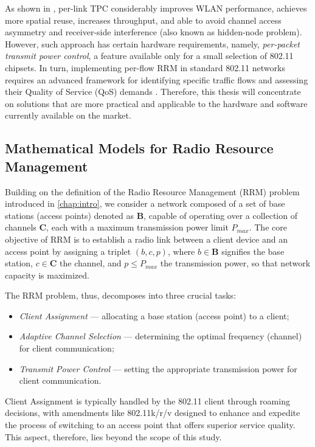 As shown in \cite{ramachandranSymphonySynchronousTwophase2008}, per-link TPC considerably improves WLAN performance, achieves more spatial reuse, increases throughput, and able to avoid channel access asymmetry and receiver-side interference (also known as hidden-node problem). However, such approach has certain hardware requirements, namely, \textit{per-packet transmit power control}, a feature available only for a small selection of 802.11 chipsets.
In turn, implementing per-flow RRM in standard 802.11 networks requires an advanced framework for identifying specific traffic flows and assessing their Quality of Service (QoS) demands \cite{bouhafsPerFlowRadioResource2020}. Therefore, this thesis will concentrate on solutions that are more practical and applicable to the hardware and software currently available on the market.

\subsection{Mathematical Models for Radio Resource Management}
\label{chap:lr:sec:math_models}

Building on the definition of the Radio Resource Management (RRM) problem introduced in \ref{chap:intro}, we consider a network composed of a set of base stations (access points) denoted as $\boldsymbol{B}$, capable of operating over a collection of channels $\boldsymbol{C}$, each with a maximum transmission power limit $P_{max}$. The core objective of RRM is to establish a radio link between a client device and an access point by assigning a triplet $(b, c, p)$, where $b \in \boldsymbol{B}$ signifies the base station, $c \in \boldsymbol{C}$ the channel, and $p \leq P_{max}$ the transmission power, so that network capacity is maximized.

The RRM problem, thus, decomposes into three crucial tasks:
\begin{itemize}
\item \textit{Client Assignment} --- allocating a base station (access point) to a client;
\item \textit{Adaptive Channel Selection} --- determining the optimal frequency (channel) for client communication;
\item \textit{Transmit Power Control} --- setting the appropriate transmission power for client communication.
\end{itemize}

Client Assignment is typically handled by the 802.11 client through roaming decisions, with amendments like 802.11k/r/v designed to enhance and expedite the process of switching to an access point that offers superior service quality. This aspect, therefore, lies beyond the scope of this study.

